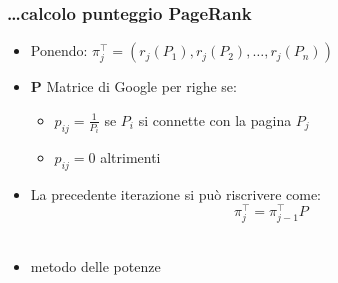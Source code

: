 \documentclass{beamer}
\begin{document}
\begin{frame}
	\frametitle{\dots calcolo punteggio PageRank}
	\begin{itemize}
		\item Ponendo: $\pi_j^\intercal = (r_j(P_1),r_j(P_2),\dots,r_j(P_n))$\\
		\item \textbf{P} Matrice di Google per righe se:
		\begin{itemize}
			\item $p_{ij}= \frac{1}{P_i}$ se $P_i$ si connette con la pagina $P_j$
			\item $p_{ij}=0$ altrimenti
		\end{itemize}
		\item La precedente iterazione si può riscrivere come: $$ \pi_j^\intercal = \pi_{j-1}^\intercal P$$\\
		\item metodo delle potenze
	\end{itemize}
\end{frame}

\end{document}
